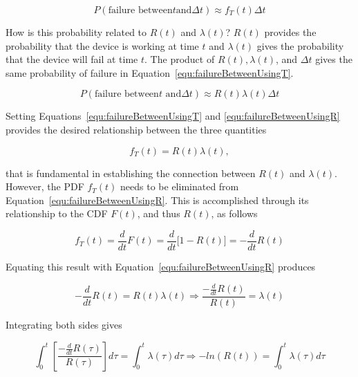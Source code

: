 {\begin{equation}
\label{equ:failureBetweenUsingT}
P(\text{failure between} t \text{and} \Delta t) \approx f_T(t) \Delta t
\end{equation}

How is this probability related to $R(t)$ and $\lambda(t)$?
$R(t)$ provides the probability that the device is working at time $t$
and $\lambda(t)$ gives the probability that the device will fail
at time $t$. The product of $R(t), \lambda(t)$, and $\Delta t$ gives
the same probability of failure in Equation~\ref{equ:failureBetweenUsingT}.

\begin{equation}
\label{equ:failureBetweenUsingR}
P(\text{failure between} t \text{ and} \Delta t) \approx R(t) \lambda(t) \Delta t
\end{equation}

Setting Equations~\ref{equ:failureBetweenUsingT} and  \ref{equ:failureBetweenUsingR} 
provides the desired relationship between the three quantities

\begin{equation}
\label{equ:failureBetweenUsingR}
f_T(t) = R(t) \lambda(t) ,
\end{equation}

that is fundamental in establishing the connection between $R(t)$
and $\lambda(t)$. However, the PDF $f_T(t)$ needs to be eliminated 
from Equation~\ref{equ:failureBetweenUsingR}. This is accomplished 
through its relationship to the CDF
$F(t)$, and thus $R(t)$, as follows

\begin{equation}
\label{equ:cdfOfF}
f_T(t) = \frac{d}{dt}F(t) = \frac{d}{dt}\big[1-R(t)\big] = -\frac{d}{dt}R(t)
\end{equation}

Equating this result with Equation~\ref{equ:failureBetweenUsingR}
produces

\begin{equation}
\label{equ:cdfOfF}
-\frac{d}{dt}R(t) = R(t)\lambda(t) \Rightarrow \frac{ - \frac{d}{dt}R(t)} {R(t)} = \lambda(t)
\end{equation}

Integrating both sides gives

\begin{equation}
\label{equ:bigIntegral}
\int^{t}_0 [  \frac{ - \frac{d}{dt} R(\tau)}{R(\tau)} ] d\tau = \int^t_0 \lambda(\tau) d\tau \Rightarrow -ln(R(t)) = \int^t_0\lambda(\tau) d\tau
\end{equation}

}
